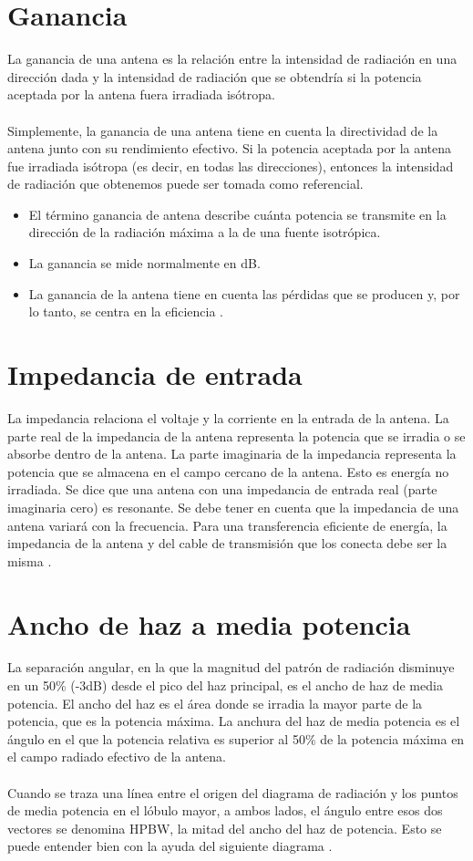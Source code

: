 \documentclass[12pt,letterpaper]{article}
\begin{document}
\section{Ganancia}
La ganancia de una antena es la relación entre la intensidad de radiación en una dirección 
dada y la intensidad de radiación que se obtendría si la potencia aceptada por la antena 
fuera irradiada isótropa.
\\ \\
Simplemente, la ganancia de una antena tiene en cuenta la directividad de la antena junto 
con su rendimiento efectivo. Si la potencia aceptada por la antena fue irradiada isótropa 
(es decir, en todas las direcciones), entonces la intensidad de radiación que obtenemos 
puede ser tomada como referencial.
\begin{itemize}
    \item El término ganancia de antena describe cuánta potencia se transmite en la 
    dirección de la radiación máxima a la de una fuente isotrópica.
    \item La ganancia se mide normalmente en dB.
    \item La ganancia de la antena tiene en cuenta las pérdidas que se producen y, 
    por lo tanto, se centra en la eficiencia \cite{polarizacion}.
\end{itemize}

\section{Impedancia de entrada}
La impedancia relaciona el voltaje y la corriente en la entrada de la antena. La 
parte real de la impedancia de la antena representa la potencia que se irradia o se 
absorbe dentro de la antena. La parte imaginaria de la impedancia representa la potencia 
que se almacena en el campo cercano de la antena. Esto es energía no irradiada. Se dice 
que una antena con una impedancia de entrada real (parte imaginaria cero) es resonante. 
Se debe tener en cuenta que la impedancia de una antena variará con la frecuencia. Para 
una transferencia eficiente de energía, la impedancia de la antena y del cable de 
transmisión que los conecta debe ser la misma \cite{polarizacion}. 

\newpage
\section{Ancho de haz a media potencia}
La separación angular, en la que la magnitud del patrón de radiación disminuye en un 
50\% (-3dB) desde el pico del haz principal, es el ancho de haz de media potencia. El 
ancho del haz es el área donde se irradia la mayor parte de la potencia, que es la 
potencia máxima. La anchura del haz de media potencia es el ángulo en el que la potencia 
relativa es superior al 50\% de la potencia máxima en el campo radiado efectivo de la antena.
\\ \\
Cuando se traza una línea entre el origen del diagrama de radiación y los puntos de 
media potencia en el lóbulo mayor, a ambos lados, el ángulo entre esos dos vectores se 
denomina HPBW, la mitad del ancho del haz de potencia. Esto se puede entender bien con 
la ayuda del siguiente diagrama \cite{haz}.
\end{document}
